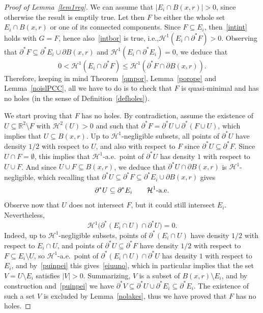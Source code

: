 \documentclass[11pt]{article}
\newcommand{\ie}{i.e.,\xspace}
\numberwithin{equation}{section}
\newcommand\R{\mathbb{R}}
\renewcommand\H{\mathcal{H}}
\theoremstyle{plain}
\theoremstyle{definition}
\begin{document}
\begin{proof}[Proof of Lemma~\ref{lem1reg}]
We can assume that $|E_i\cap B(x,r)|>0$, since otherwise the result is emptily true. Let then $F$ be either the whole set $E_i\cap B(x,r)$ or one of its connected components. Since $F\subseteq E_i$, then~\eqref{intint} holds with $G=F$, hence also~\eqref{intbor} is true, \ie $\H^1(E_i \cap \partial^* F)>0$. Observing that $\partial^* F\subseteq \partial^* E_i \cup \partial B(x,r)$ and $\H^1(E_i\cap\partial^* E_i)=0$, we deduce that
\[
0<\H^1(E_i \cap\partial^* F)\leq\H^1(\partial^* F\cap \partial B(x,r)).
\]
Therefore, keeping in mind Theorem~\ref{qmpor}, Lemma~\ref{porope} and Lemma~\ref{noislPCC}, all we have to do is to check that $F$ is quasi-minimal and has no holes (in the sense of Definition~\ref{defholes}).

We start proving that $F$ has no holes. By contradiction, assume the existence of $U\subseteq\R^2\setminus F$ with $\H^2(U)>0$ and such that $\partial^* F =\partial^* U \cup \partial^*(F\cup U)$, which implies that $U\subseteq B(x,r)$. Up to $\H^1$-negligible subsets, all points of $\partial^* U$ have density $1/2$ with respect to $U$, and also with respect to $F$ since $\partial^* U \subseteq \partial^* F$. Since $U\cap F=\emptyset$, this implies that $\H^1$-a.e.\ point of $\partial^* U$ has density $1$ with respect to $U\cup F$. And since $U\cup F\subseteq B(x,r)$, we deduce that $\partial^* U\cap\partial B(x,r)$ is $\H^1$-negligible, which recalling that $\partial^* U \subseteq \partial^* F \subseteq \partial^* E_i \cup \partial B(x,r)$ gives
\begin{equation}\label{puinpei}
\partial^* U\subseteq \partial^* E_i \qquad \H^1\hbox{-a.e.}
\end{equation}
Observe now that $U$ does not intersect $F$, but it could still intersect $E_i$. Nevertheless,
\begin{equation}\label{eiuuno}
\H^1\big(\partial^*(E_i\cap U) \cap \partial^* U \big)=0.
\end{equation}
Indeed, up to $\H^1$-negligible subsets, points of $\partial^*(E_i \cap U)$ have density $1/2$ with respect to $E_i\cap U$, and points of $\partial^* U\subseteq \partial^* F$ have density $1/2$ with respect to $F\subseteq E_i\setminus U$, so $\H^1$-a.e.\ point of $\partial^*(E_i\cap U) \cap \partial^* U$ has density $1$ with respect to $E_i$, and by~\eqref{puinpei} this gives~\eqref{eiuuno}, which in particular implies that the set $V=U\setminus E_i$ satisfies $|V|>0$. Summarizing, $V$ is a subset of $B(x,r)\setminus E_i$, and by construction and~\eqref{puinpei} we have $\partial^* V\subseteq \partial^* U \cup \partial^* E_i\subseteq \partial^* E_i$. The existence of such a set $V$ is excluded by Lemma~\ref{nolakes}, thus we have proved that $F$ has no holes.


\end{proof}
\end{document}
